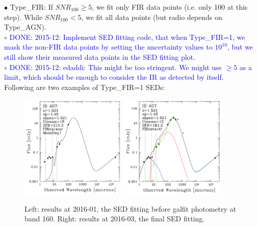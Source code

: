 \documentclass[11pt,a4paper]{article}
\begin{document}
\indent\hspace{15pt}$\bullet$ 
Type\_FIR: If $SNR_{100} \ge 5$, we fit only FIR data points (i.e. only 100 at this step). While $SNR_{100} < 5$, we fit all data points (but radio depends on Type\_AGN).
\\
\indent\hspace{15pt}$\circ$ 
\textcolor{blue}{DONE: 2015-12: Implement SED fitting code, that when Type\_FIR=1, we mask the non-FIR data points by setting the uncertainty values to $10^{10}$, but we still show their measured data points in the SED fitting plot. }
\\
\indent\hspace{15pt}$\circ$ 
\textcolor{blue}{DONE: 2015-12: edaddi: This might be too stringent. We might use $\ge 5$ as a limit, which should be enough to consider the IR as detected by itself.}
\\

Following are two examples of Type\_FIR=1 SEDs: 

\begin{figure}[H]
	\includegraphics[width=0.45\textwidth]{galsed_160_Plot_SED_407_v20160106}
	\includegraphics[width=0.45\textwidth]{galsed_160_Plot_SED_407_v20160309}
	\caption{Left: results at 2016-01, the SED fitting before galfit photometry at band 160. Right: results at 2016-03, the final SED fitting. }
\end{figure}
\end{document}
